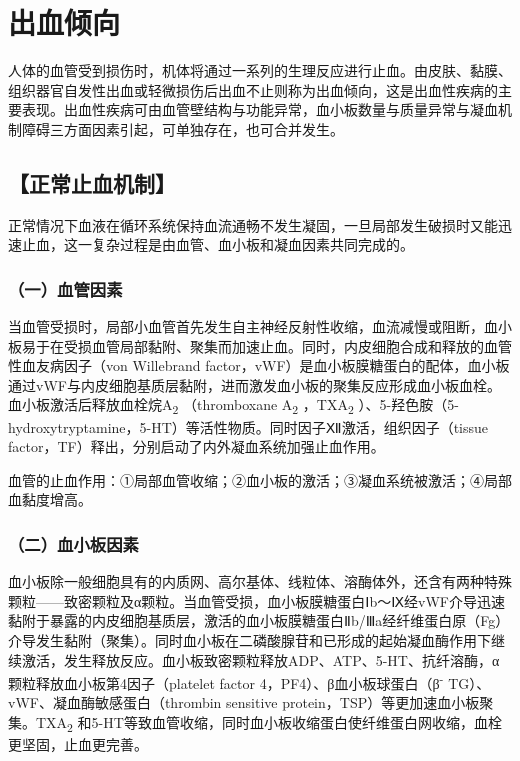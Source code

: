 \chapter{出血倾向}

人体的血管受到损伤时，机体将通过一系列的生理反应进行止血。由皮肤、黏膜、组织器官自发性出血或轻微损伤后出血不止则称为出血倾向，这是出血性疾病的主要表现。出血性疾病可由血管壁结构与功能异常，血小板数量与质量异常与凝血机制障碍三方面因素引起，可单独存在，也可合并发生。

\section{【正常止血机制】}

正常情况下血液在循环系统保持血流通畅不发生凝固，一旦局部发生破损时又能迅速止血，这一复杂过程是由血管、血小板和凝血因素共同完成的。

\subsection{（一）血管因素}

当血管受损时，局部小血管首先发生自主神经反射性收缩，血流减慢或阻断，血小板易于在受损血管局部黏附、聚集而加速止血。同时，内皮细胞合成和释放的血管性血友病因子（von
Willebrand
factor，vWF）是血小板膜糖蛋白的配体，血小板通过vWF与内皮细胞基质层黏附，进而激发血小板的聚集反应形成血小板血栓。血小板激活后释放血栓烷A\textsubscript{2}
（thromboxane A\textsubscript{2} ，TXA\textsubscript{2}
）、5-羟色胺（5-hydroxytryptamine，5-HT）等活性物质。同时因子Ⅻ激活，组织因子（tissue
factor，TF）释出，分别启动了内外凝血系统加强止血作用。

血管的止血作用：①局部血管收缩；②血小板的激活；③凝血系统被激活；④局部血黏度增高。

\subsection{（二）血小板因素}

血小板除一般细胞具有的内质网、高尔基体、线粒体、溶酶体外，还含有两种特殊颗粒------致密颗粒及α颗粒。当血管受损，血小板膜糖蛋白Ⅰb～Ⅸ经vWF介导迅速黏附于暴露的内皮细胞基质层，激活的血小板膜糖蛋白Ⅱb/Ⅲa经纤维蛋白原（Fg）介导发生黏附（聚集）。同时血小板在二磷酸腺苷和已形成的起始凝血酶作用下继续激活，发生释放反应。血小板致密颗粒释放ADP、ATP、5-HT、抗纤溶酶，α颗粒释放血小板第4因子（platelet
factor 4，PF4）、β血小板球蛋白（β\textsuperscript{-}
TG）、vWF、凝血酶敏感蛋白（thrombin sensitive
protein，TSP）等更加速血小板聚集。TXA\textsubscript{2}
和5-HT等致血管收缩，同时血小板收缩蛋白使纤维蛋白网收缩，血栓更坚固，止血更完善。

